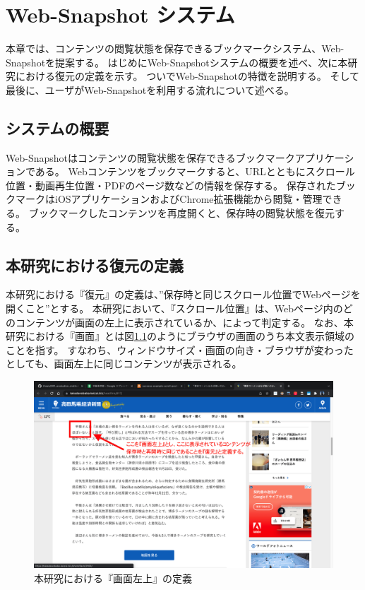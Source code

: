 \chapter{Web-Snapshot システム}
\label{chap:web_snapshot_system}
本章では、コンテンツの閲覧状態を保存できるブックマークシステム、Web-Snapshotを提案する。
はじめにWeb-Snapshotシステムの概要を述べ、次に本研究における復元の定義を示す。
ついでWeb-Snapshotの特徴を説明する。
そして最後に、ユーザがWeb-Snapshotを利用する流れについて述べる。

\section{システムの概要}
Web-Snapshotはコンテンツの閲覧状態を保存できるブックマークアプリケーションである。
Webコンテンツをブックマークすると、URLとともにスクロール位置・動画再生位置・PDFのページ数などの情報を保存する。
保存されたブックマークはiOSアプリケーションおよびChrome拡張機能から閲覧・管理できる。
ブックマークしたコンテンツを再度開くと、保存時の閲覧状態を復元する。

\section{本研究における復元の定義}
\label{chap:web-snapshot-system-restore-definition}
本研究における『復元』の定義は、”保存時と同じスクロール位置でWebページを開くこと”とする。
本研究において、『スクロール位置』は、Webページ内のどのコンテンツが画面の左上に表示されているか、によって判定する。
なお、本研究における『画面』とは図\ref{fig:web-snapshot-system-definition-description-scroll-position}のようにブラウザの画面のうち本文表示領域のことを指す。
すなわち、ウィンドウサイズ・画面の向き・ブラウザが変わったとしても、画面左上に同じコンテンツが表示される。

\begin{figure}[htbp]
  \caption{本研究における『画面左上』の定義}
  \label{fig:web-snapshot-system-definition-description-scroll-position}
  \begin{center}
    \includegraphics[bb=0 0 1440 900,width=15cm]{img/030_web_snapshot_system/description-scroll-position-definition.pdf}
  \end{center}
\end{figure}


